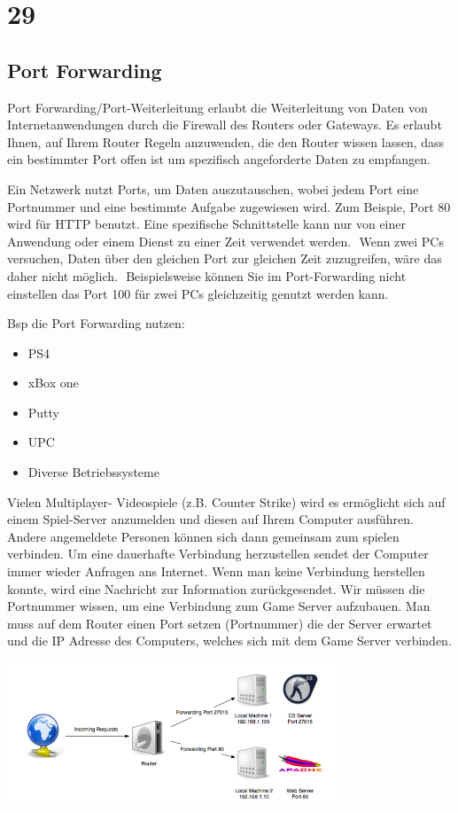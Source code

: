 \documentclass[12pt, a4paper]{article}
\begin{document}
	\newpage
	
	\section*{29}
	\subsection*{Port Forwarding}

	Port Forwarding/Port-Weiterleitung erlaubt die Weiterleitung von Daten von Internetanwendungen durch die Firewall des Routers oder Gateways.  Es erlaubt Ihnen, auf Ihrem Router Regeln anzuwenden, die den Router wissen lassen, dass ein bestimmter Port offen ist um spezifisch angeforderte Daten zu empfangen.  
	
	Ein Netzwerk nutzt Ports, um Daten auszutauschen, wobei jedem Port eine Portnummer und eine bestimmte Aufgabe zugewiesen wird. Zum Beispie, Port 80 wird für HTTP benutzt. Eine spezifische Schnittstelle kann nur von einer Anwendung oder einem Dienst zu einer Zeit verwendet werden.  Wenn zwei PCs versuchen, Daten über den gleichen Port zur gleichen Zeit zuzugreifen, wäre das daher nicht möglich.  Beispielsweise können Sie im Port-Forwarding nicht einstellen das Port 100 für zwei PCs gleichzeitig genutzt werden kann.

	Bsp die Port Forwarding nutzen:
 	\begin{itemize}
 	\item PS4
 	\item xBox one
 	\item Putty
 	\item UPC
 	\item Diverse Betriebssysteme
	\end{itemize}
	
	Vielen Multiplayer- Videospiele (z.B. Counter Strike) wird es ermöglicht sich auf einem Spiel-Server anzumelden und diesen auf Ihrem Computer ausführen.  
	Andere angemeldete Personen können sich dann gemeinsam zum spielen verbinden. Um eine dauerhafte Verbindung herzustellen sendet der Computer immer wieder Anfragen ans Internet.
	Wenn man keine Verbindung herstellen konnte, wird eine Nachricht zur Information zurückgesendet.
	Wir müssen die Portnummer wissen, um eine Verbindung zum Game Server aufzubauen.
	Man muss auf dem Router einen Port setzen (Portnummer) die der Server erwartet und die IP Adresse des Computers, welches sich mit dem Game Server verbinden.


\includegraphics[width=10cm]{port.png}\\
\end{document}
